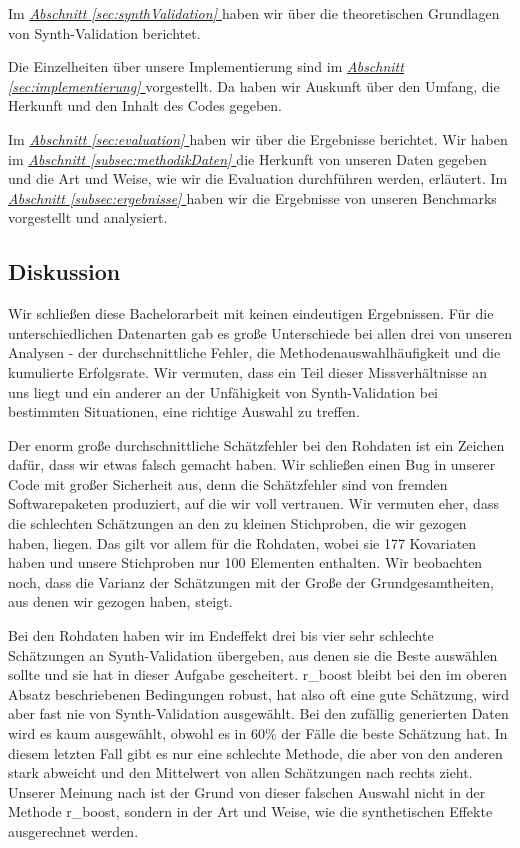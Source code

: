 \documentclass[12pt,a4paper,twoside]{scrartcl}
\numberwithin{equation}{section}
\newcommand{\refsec}[1]{\emph{\hyperref[#1]{Abschnitt \ref*{#1} }}}
\begin{document}
\noindent
Im \refsec{sec:synthValidation} haben wir über die theoretischen Grundlagen von Synth-Validation berichtet.

\noindent
Die Einzelheiten über unsere Implementierung sind im \refsec{sec:implementierung} vorgestellt. Da haben wir Auskunft über den Umfang, die Herkunft und den Inhalt des Codes gegeben.\par

\noindent
Im \refsec{sec:evaluation} haben wir über die Ergebnisse berichtet. Wir haben im \refsec{subsec:methodikDaten} die Herkunft von unseren Daten gegeben und die Art und Weise, wie wir die Evaluation durchführen werden, erläutert. Im \refsec{subsec:ergebnisse} haben wir die Ergebnisse von unseren Benchmarks vorgestellt und analysiert.\par
 	
\subsection{Diskussion}\label{subsec:diskussion}

Wir schließen diese Bachelorarbeit mit keinen eindeutigen Ergebnissen. Für die unterschiedlichen Datenarten gab es große Unterschiede bei allen drei von unseren Analysen - der durchschnittliche Fehler, die Methodenauswahlhäufigkeit und die kumulierte Erfolgsrate. Wir vermuten, dass ein Teil dieser Missverhältnisse an uns liegt und ein anderer an der Unfähigkeit von Synth-Validation bei bestimmten Situationen, eine richtige Auswahl zu treffen. \par

\noindent
Der enorm große durchschnittliche Schätzfehler bei den Rohdaten ist ein Zeichen dafür, dass wir etwas falsch gemacht haben. Wir schließen einen Bug in unserer Code mit großer Sicherheit aus, denn die Schätzfehler sind von fremden Softwarepaketen produziert, auf die wir voll vertrauen. Wir vermuten eher, dass die schlechten Schätzungen an den zu kleinen Stichproben, die wir gezogen haben, liegen. Das gilt vor allem für die Rohdaten, wobei sie 177 Kovariaten haben und unsere Stichproben nur 100 Elementen enthalten. Wir beobachten noch, dass die Varianz der Schätzungen mit der Große der Grundgesamtheiten, aus denen wir gezogen haben, steigt. \par

\noindent
Bei den Rohdaten haben wir im Endeffekt drei bis vier sehr schlechte Schätzungen an Synth-Validation übergeben, aus denen sie die Beste auswählen sollte und sie hat in dieser Aufgabe gescheitert. r\_boost bleibt bei den im oberen Absatz beschriebenen Bedingungen robust, hat also oft eine gute Schätzung, wird aber fast nie von Synth-Validation ausgewählt. Bei den zufällig generierten Daten wird es kaum ausgewählt, obwohl es in 60\% der Fälle die beste Schätzung hat. In diesem letzten Fall gibt es nur eine schlechte Methode, die aber von den anderen stark abweicht und den Mittelwert von allen Schätzungen nach rechts zieht. Unserer Meinung nach ist der Grund von dieser falschen Auswahl nicht in der Methode r\_boost, sondern in der Art und Weise, wie die synthetischen Effekte ausgerechnet werden.\par
\end{document}
